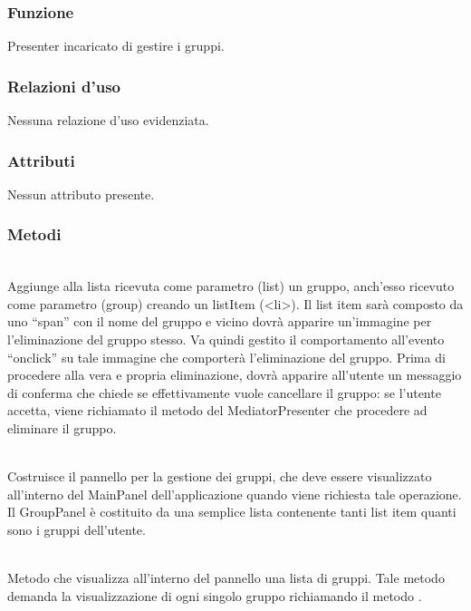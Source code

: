
\subsubsection*{Funzione}
Presenter incaricato di gestire i gruppi.

\subsubsection*{Relazioni d'uso}
Nessuna relazione d'uso evidenziata.

\subsubsection*{Attributi}
\begin{description}
\item Nessun attributo presente.
\end{description}

\subsubsection*{Metodi}
\begin{description}
\item{}\\
Aggiunge alla lista ricevuta come parametro (list) un gruppo, anch'esso ricevuto come parametro (group) creando un listItem (<li>). Il list item sarà composto da uno ``span'' con il nome del gruppo e vicino dovrà apparire un'immagine per l'eliminazione del gruppo stesso. Va quindi gestito il comportamento all'evento ``onclick'' su tale immagine che comporterà l'eliminazione del gruppo. Prima di procedere alla vera e propria eliminazione, dovrà apparire all'utente un messaggio di conferma che chiede se effettivamente vuole cancellare il gruppo: se l'utente accetta, viene richiamato il metodo del MediatorPresenter  che procedere ad eliminare il gruppo.

\item{}\\
Costruisce il pannello per la gestione dei gruppi, che deve essere visualizzato all'interno del MainPanel dell'applicazione quando viene richiesta tale operazione. Il GroupPanel è costituito da una semplice lista contenente tanti list item quanti sono i gruppi dell'utente.

\item{}\\
Metodo che visualizza all'interno del pannello una lista di gruppi. Tale metodo demanda la visualizzazione di ogni singolo gruppo richiamando il metodo .

\end{description}


